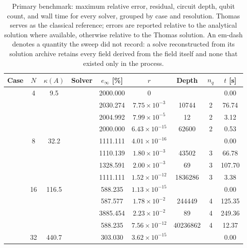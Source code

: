 \begin{table}[htbp]
  \centering
  \caption{Primary benchmark: maximum relative error, residual, circuit depth, qubit count, and wall time for every solver, grouped by case and resolution. Thomas serves as the classical reference; errors are reported relative to the analytical solution where available, otherwise relative to the Thomas solution. An em-dash denotes a quantity the sweep did not record: a solve reconstructed from its solution archive retains every field derived from the field itself and none that existed only in the process.}
  \label{tab:primary_comparison}
  \begin{tabular}{l S[table-format=3.0] S[table-format=4.1] l S[table-format=3.3] S[table-format=1.2e2] S[table-format=6.0] S[table-format=2.0] S[table-format=4.2]}
    \toprule
    {Case} & {$N$} & {$\kappa(A)$} & {Solver} & {$e_\infty$ [\%]} & {$r$} & {Depth} & {$n_q$} & {$t$ [s]} \\
    \midrule
     & 4 & 9.5 &  & 2000.000 & $0$ & {\text{---}} & {\text{---}} & 0.00 \\
     &  &  &  & 2030.274 & $7.75 \times 10^{-3}$ & 10744 & 2 & 76.74 \\
     &  &  &  & 2004.992 & $7.99 \times 10^{-5}$ & 12 & 2 & 3.12 \\
     &  &  &  & 2000.000 & $6.43 \times 10^{-15}$ & 62600 & 2 & 0.53 \\
     & 8 & 32.2 &  & 1111.111 & $4.01 \times 10^{-16}$ & {\text{---}} & {\text{---}} & 0.00 \\
     &  &  &  & 1110.139 & $1.80 \times 10^{-3}$ & 43502 & 3 & 66.78 \\
     &  &  &  & 1328.591 & $2.00 \times 10^{-3}$ & 69 & 3 & 107.70 \\
     &  &  &  & 1111.111 & $1.52 \times 10^{-12}$ & 1836286 & 3 & 3.38 \\
     & 16 & 116.5 &  & 588.235 & $1.13 \times 10^{-15}$ & {\text{---}} & {\text{---}} & 0.00 \\
     &  &  &  & 587.577 & $1.78 \times 10^{-2}$ & 244449 & 4 & 125.35 \\
     &  &  &  & 3885.454 & $2.23 \times 10^{-2}$ & 89 & 4 & 249.36 \\
     &  &  &  & 588.235 & $7.56 \times 10^{-12}$ & 40236862 & 4 & 12.37 \\
     & 32 & 440.7 &  & 303.030 & $3.62 \times 10^{-15}$ & {\text{---}} & {\text{---}} & 0.00 \\

\end{tabular}
\end{table}
